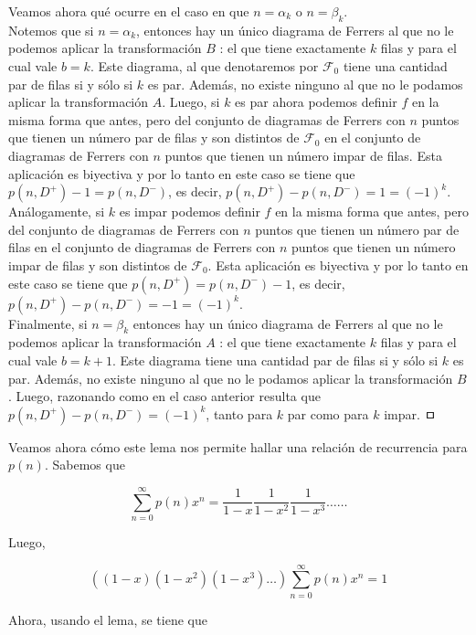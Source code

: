 \documentclass[10pt]{article}
\begin{document}
Veamos ahora qué ocurre en el caso en que $n=\alpha_{k}$ o $n=\beta_{k}$.\\
Notemos que si $n=\alpha_{k}$, entonces hay un único diagrama de Ferrers al que no le podemos aplicar la transformación $B$ : el que tiene exactamente $k$ filas y para el cual vale $b=k$. Este diagrama, al que denotaremos por $\mathcal{F}_{0}$ tiene una cantidad par de filas si y sólo si $k$ es par. Además, no existe ninguno al que no le podamos aplicar la transformación $A$. Luego, si $k$ es par ahora podemos definir $f$ en la misma forma que antes, pero del conjunto de diagramas de Ferrers con $n$ puntos que tienen un número par de filas y son distintos de $\mathcal{F}_{0}$ en el conjunto de diagramas de Ferrers con $n$ puntos que tienen un número impar de filas. Esta aplicación es biyectiva y por lo tanto en este caso se tiene que $p\left(n, D^{+}\right)-1=p\left(n, D^{-}\right)$, es decir, $p\left(n, D^{+}\right)-p\left(n, D^{-}\right)=1=(-1)^{k}$.\\
Análogamente, si $k$ es impar podemos definir $f$ en la misma forma que antes, pero del conjunto de diagramas de Ferrers con $n$ puntos que tienen un número par de filas en el conjunto de diagramas de Ferrers con $n$ puntos que tienen un número impar de filas y son distintos de $\mathcal{F}_{0}$. Esta aplicación es biyectiva y por lo tanto en este caso se tiene que $p\left(n, D^{+}\right)=p\left(n, D^{-}\right)-1$, es decir, $p\left(n, D^{+}\right)-p\left(n, D^{-}\right)=-1=(-1)^{k}$.\\
Finalmente, si $n=\beta_{k}$ entonces hay un único diagrama de Ferrers al que no le podemos aplicar la transformación $A$ : el que tiene exactamente $k$ filas y para el cual vale $b=k+1$. Este diagrama tiene una cantidad par de filas si y sólo si $k$ es par. Además, no existe ninguno al que no le podamos aplicar la transformación $B$. Luego, razonando como en el caso anterior resulta que $p\left(n, D^{+}\right)-p\left(n, D^{-}\right)=(-1)^{k}$, tanto para $k$ par como para $k$ impar. ㅁ

Veamos ahora cómo este lema nos permite hallar una relación de recurrencia para $p(n)$. Sabemos que

$$
\sum_{n=0}^{\infty} p(n) x^{n}=\frac{1}{1-x} \frac{1}{1-x^{2}} \frac{1}{1-x^{3}} \ldots \ldots
$$

Luego,

$$
\left((1-x)\left(1-x^{2}\right)\left(1-x^{3}\right) \ldots\right) \sum_{n=0}^{\infty} p(n) x^{n}=1
$$

Ahora, usando el lema, se tiene que
\end{document}
